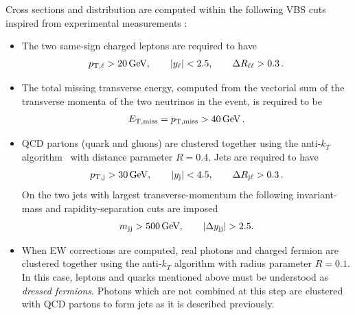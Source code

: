 Cross sections and distribution are computed within the following VBS cuts inspired from experimental measurements \cite{Aad:2014zda,Aaboud:2016ffv,Khachatryan:2014sta,CMS:2017adb}: 
\begin{itemize}
    \item The two same-sign charged leptons are required to have
        \begin{align}
         p_{\text{T},\ell} >  20\,\text{GeV},\qquad |y_{\ell}| < 2.5, \qquad \Delta R_{\ell\ell}> 0.3\,.
        \end{align}
    \item The total missing transverse energy, computed from the vectorial sum of the transverse momenta of the two neutrinos in the event,
        is required to be
        \begin{align}
          E_{\text{T},\text{miss}}=p_{\rm T, miss} >  40\,\text{GeV}\,.
        \end{align}
    \item QCD partons (quark and gluons) are clustered together using the anti-$k_T$ algorithm~\cite{Cacciari:2008gp} with distance parameter $R=0.4$. Jets are required
        to have
        \begin{align}
         p_{\text{T},\text{j}} >  30\,\text{GeV}, \qquad |y_\text{j}| < 4.5, \qquad \Delta R_{\text{j}\ell} > 0.3 \,.
        \end{align}
        On the two jets with largest transverse-momentum the following invariant-mass and rapidity-separation cuts are imposed
        \begin{align}
         m_{\text{j} \text{j}} >  500\,\text{GeV},\qquad |\Delta y_{\text{j} \text{j}}| > 2.5.
        \end{align}
    \item When EW corrections are computed, real photons and charged fermion are clustered together using the anti-$k_T$ algorithm with 
        radius parameter $R=0.1$. In this case, leptons and quarks mentioned above must be understood as {\it dressed fermions}. Photons
        which are not combined at this step are clustered with QCD partons to form jets as it is described previously.
\end{itemize}


